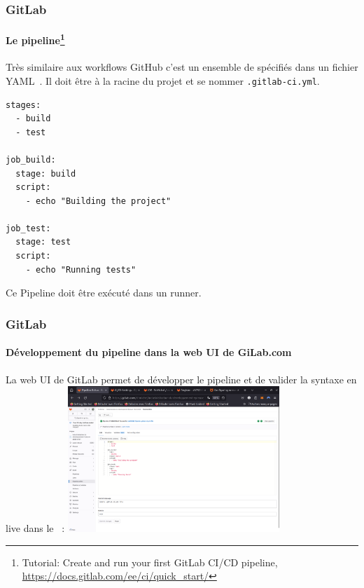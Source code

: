 \documentclass{beamer}
\begin{document}
    \begin{frame}[fragile]
        \frametitle{GitLab}
        \framesubtitle{Le pipeline\footnote{Tutorial: Create and run your first GitLab CI/CD pipeline, \url{https://docs.gitlab.com/ee/ci/quick_start/}}}
        \transdissolve
        Très similaire aux workflows GitHub c'est un ensemble de  spécifiés dans un fichier YAML~.
        \bigbreak
        Il doit être à la racine du projet et se nommer \lstinline{.gitlab-ci.yml}.
        \begin{lstlisting}[basicstyle=\ttfamily\tiny]
stages:
  - build
  - test

job_build:
  stage: build
  script:
    - echo "Building the project"

job_test:
  stage: test
  script:
    - echo "Running tests"
        \end{lstlisting}
        Ce Pipeline doit être exécuté dans un runner.
    \end{frame}

    \begin{frame}
        \frametitle{GitLab}
        \framesubtitle{Développement du pipeline dans la web UI de GiLab.com}
        \transdissolve
        La web UI de GitLab permet de développer le pipeline et de valider la syntaxe en live dans le ~:
        \bigbreak
        \centering
        \includegraphics[width=8cm]{image/gitlab-pipeline-editor.png}
    \end{frame}
\end{document}
